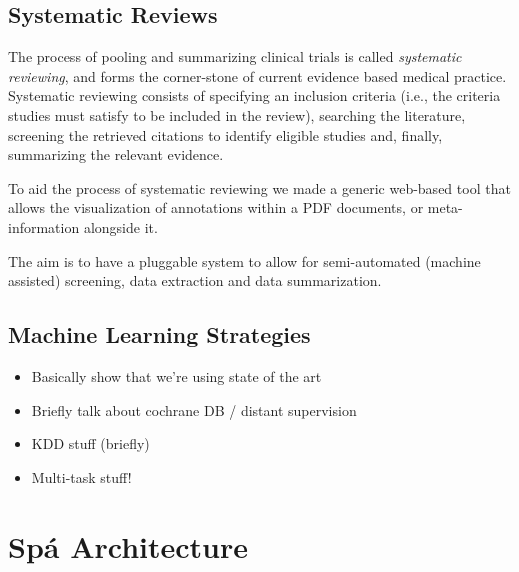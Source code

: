 \documentclass[runningheads,a4paper]{llncs}
\newcommand{\highlight}[1]{\colorbox{yellow}{#1}}
\begin{document}
\subsection{Systematic Reviews}
The process of pooling and summarizing clinical trials is called \emph{systematic reviewing}, and forms the corner-stone of current evidence based medical practice. Systematic reviewing consists of specifying an inclusion criteria (i.e., the criteria studies must satisfy to be included in the review), searching the literature, screening the retrieved citations to identify eligible studies and, finally, summarizing the relevant evidence.

To aid the process of systematic reviewing we made a generic web-based tool that allows the visualization of annotations within a PDF documents, or meta-information alongside it.

The aim is to have a pluggable system to allow for semi-automated (machine assisted) screening, data extraction and data summarization.

\subsection{Machine Learning Strategies}

\begin{itemize}
\item Basically show that we're using state of the art
\item Briefly talk about cochrane DB / distant supervision
\item KDD stuff (briefly)
\item Multi-task stuff!
\end{itemize}

\section{Sp{\'a} Architecture}
\label{section:architecture}
\end{document}
